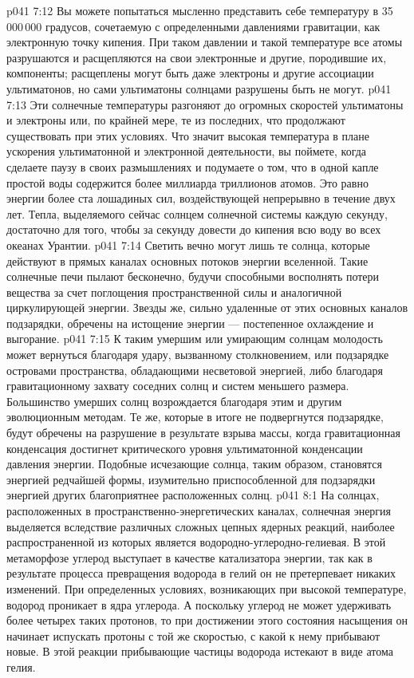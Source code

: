 \vs p041 7:12 \pc Вы можете попытаться мысленно представить себе температуру в 35\,000\,000 градусов, сочетаемую с определенными давлениями гравитации, как электронную точку кипения. При таком давлении и такой температуре все атомы разрушаются и расщепляются на свои электронные и другие, породившие их, компоненты; расщеплены могут быть даже электроны и другие ассоциации ультиматонов, но сами ультиматоны солнцами разрушены быть не могут.
\vs p041 7:13 Эти солнечные температуры разгоняют до огромных скоростей ультиматоны и электроны или, по крайней мере, те из последних, что продолжают существовать при этих условиях. Что значит высокая температура в плане ускорения ультиматонной и электронной деятельности, вы поймете, когда сделаете паузу в своих размышлениях и подумаете о том, что в одной капле простой воды содержится более миллиарда триллионов атомов. Это равно энергии более ста лошадиных сил, воздействующей непрерывно в течение двух лет. Тепла, выделяемого сейчас солнцем солнечной системы каждую секунду, достаточно для того, чтобы за секунду довести до кипения всю воду во всех океанах Урантии.
\vs p041 7:14 \pc Светить вечно могут лишь те солнца, которые действуют в прямых каналах основных потоков энергии вселенной. Такие солнечные печи пылают бесконечно, будучи способными восполнять потери вещества за счет поглощения пространственной силы и аналогичной циркулирующей энергии. Звезды же, сильно удаленные от этих основных каналов подзарядки, обречены на истощение энергии --- постепенное охлаждение и выгорание.
\vs p041 7:15 К таким умершим или умирающим солнцам молодость может вернуться благодаря удару, вызванному столкновением, или подзарядке островами пространства, обладающими несветовой энергией, либо благодаря гравитационному захвату соседних солнц и систем меньшего размера. Большинство умерших солнц возрождается благодаря этим и другим эволюционным методам. Те же, которые в итоге не подвергнутся подзарядке, будут обречены на разрушение в результате взрыва массы, когда гравитационная конденсация достигнет критического уровня ультиматонной конденсации давления энергии. Подобные исчезающие солнца, таким образом, становятся энергией редчайшей формы, изумительно приспособленной для подзарядки энергией других благоприятнее расположенных солнц.
\vs p041 8:1 На солнцах, расположенных в пространственно\hyp{}энергетических каналах, солнечная энергия выделяется вследствие различных сложных цепных ядерных реакций, наиболее распространенной из которых является водородно\hyp{}углеродно\hyp{}гелиевая. В этой метаморфозе углерод выступает в качестве катализатора энергии, так как в результате процесса превращения водорода в гелий он не претерпевает никаких изменений. При определенных условиях, возникающих при высокой температуре, водород проникает в ядра углерода. А поскольку углерод не может удерживать более четырех таких протонов, то при достижении этого состояния насыщения он начинает испускать протоны с той же скоростью, с какой к нему прибывают новые. В этой реакции прибывающие частицы водорода истекают в виде атома гелия.
